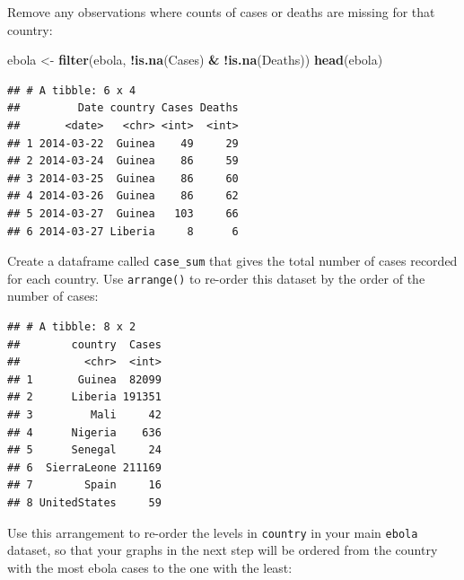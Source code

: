 \documentclass[]{book}
\makeatletter
\newenvironment{Shaded}{\begin{snugshade}}{\end{snugshade}}
\newcommand{\KeywordTok}[1]{\textcolor[rgb]{0.13,0.29,0.53}{\textbf{#1}}}
\newcommand{\DataTypeTok}[1]{\textcolor[rgb]{0.13,0.29,0.53}{#1}}
\newcommand{\StringTok}[1]{\textcolor[rgb]{0.31,0.60,0.02}{#1}}
\newcommand{\OtherTok}[1]{\textcolor[rgb]{0.56,0.35,0.01}{#1}}
\newcommand{\OperatorTok}[1]{\textcolor[rgb]{0.81,0.36,0.00}{\textbf{#1}}}
\newcommand{\NormalTok}[1]{#1}
\newenvironment{kframe}{%
\medskip{}
\setlength{\fboxsep}{.8em}
 \def\at@end@of@kframe{}%
 \ifinner\ifhmode%
  \def\at@end@of@kframe{\end{minipage}}%
  \begin{minipage}{\columnwidth}%
 \fi\fi%
 \def\FrameCommand##1{\hskip\@totalleftmargin \hskip-\fboxsep
 \colorbox{shadecolor}{##1}\hskip-\fboxsep
     \hskip-\linewidth \hskip-\@totalleftmargin \hskip\columnwidth}%
 \MakeFramed {\advance\hsize-\width
   \@totalleftmargin\z@ \linewidth\hsize
   \@setminipage}}%
 {\par\unskip\endMakeFramed%
 \at@end@of@kframe}
\renewenvironment{Shaded}{\begin{kframe}}{\end{kframe}}
\theoremstyle{definition}
\theoremstyle{definition}
\theoremstyle{definition}
\theoremstyle{remark}
\makeatother
\begin{document}
Remove any observations where counts of cases or deaths are missing for
that country:

\begin{Shaded}
\begin{Highlighting}[]
\NormalTok{ebola <-}\StringTok{ }\KeywordTok{filter}\NormalTok{(ebola, }\OperatorTok{!}\KeywordTok{is.na}\NormalTok{(Cases) }\OperatorTok{&}\StringTok{ }\OperatorTok{!}\KeywordTok{is.na}\NormalTok{(Deaths))}
\KeywordTok{head}\NormalTok{(ebola)}
\end{Highlighting}
\end{Shaded}

\begin{verbatim}
## # A tibble: 6 x 4
##         Date country Cases Deaths
##       <date>   <chr> <int>  <int>
## 1 2014-03-22  Guinea    49     29
## 2 2014-03-24  Guinea    86     59
## 3 2014-03-25  Guinea    86     60
## 4 2014-03-26  Guinea    86     62
## 5 2014-03-27  Guinea   103     66
## 6 2014-03-27 Liberia     8      6
\end{verbatim}

Create a dataframe called \texttt{case\_sum} that gives the total number
of cases recorded for each country. Use \texttt{arrange()} to re-order
this dataset by the order of the number of cases:

\begin{Shaded}
\end{Shaded}

\begin{verbatim}
## # A tibble: 8 x 2
##        country  Cases
##          <chr>  <int>
## 1       Guinea  82099
## 2      Liberia 191351
## 3         Mali     42
## 4      Nigeria    636
## 5      Senegal     24
## 6  SierraLeone 211169
## 7        Spain     16
## 8 UnitedStates     59
\end{verbatim}

Use this arrangement to re-order the levels in \texttt{country} in your
main \texttt{ebola} dataset, so that your graphs in the next step will
be ordered from the country with the most ebola cases to the one with
the least:
\end{document}
